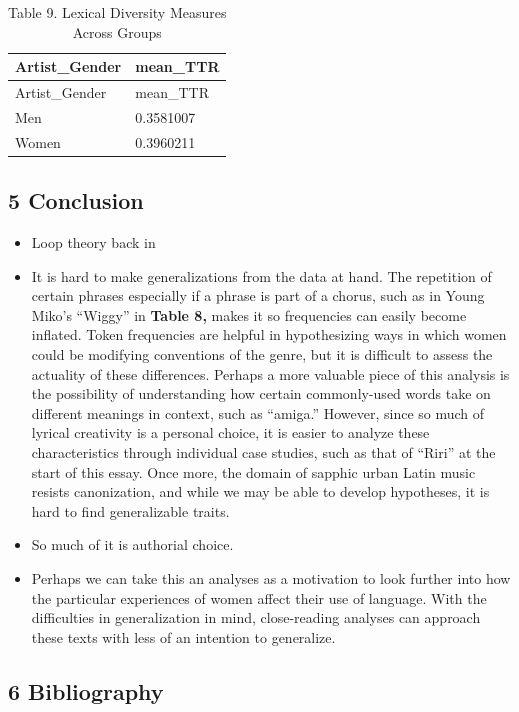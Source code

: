 \documentclass[
  letterpaper,
  DIV=11,
  numbers=noendperiod]{scrartcl}
\begin{document}
\begin{longtable}[]{@{}ll@{}}
\caption{Table 9. Lexical Diversity Measures Across
Groups}\tabularnewline
\toprule()
Artist\_Gender & mean\_TTR \\
\midrule()
\endfirsthead
\toprule()
Artist\_Gender & mean\_TTR \\
\midrule()
\endhead
Men & 0.3581007 \\
Women & 0.3960211 \\
\bottomrule()
\end{longtable}

\hypertarget{conclusion}{%
\subsection{\texorpdfstring{5
\textbf{Conclusion}}{5 Conclusion}}\label{conclusion}}

\begin{itemize}
\item
  Loop theory back in
\item
  It is hard to make generalizations from the data at hand. The
  repetition of certain phrases especially if a phrase is part of a
  chorus, such as in Young Miko's ``Wiggy'' in \textbf{Table 8,} makes
  it so frequencies can easily become inflated. Token frequencies are
  helpful in hypothesizing ways in which women could be modifying
  conventions of the genre, but it is difficult to assess the actuality
  of these differences. Perhaps a more valuable piece of this analysis
  is the possibility of understanding how certain commonly-used words
  take on different meanings in context, such as ``amiga.'' However,
  since so much of lyrical creativity is a personal choice, it is easier
  to analyze these characteristics through individual case studies, such
  as that of ``Riri'' at the start of this essay. Once more, the domain
  of sapphic urban Latin music resists canonization, and while we may be
  able to develop hypotheses, it is hard to find generalizable traits.
\item
  So much of it is authorial choice.
\item
  Perhaps we can take this an analyses as a motivation to look further
  into how the particular experiences of women affect their use of
  language. With the difficulties in generalization in mind,
  close-reading analyses can approach these texts with less of an
  intention to generalize.
\end{itemize}

\hypertarget{bibliography}{%
\subsection{6 Bibliography}\label{bibliography}}
\end{document}
